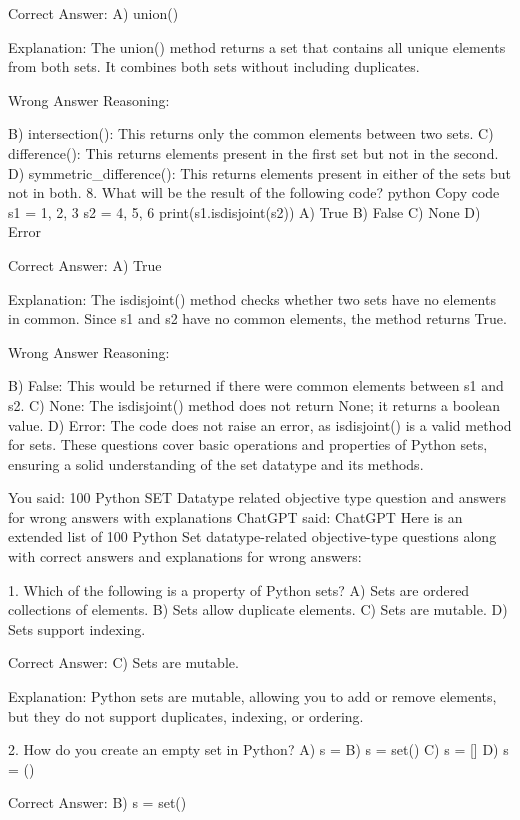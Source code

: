 Correct Answer: A) union()

Explanation:
The union() method returns a set that contains all unique elements from both sets. It combines both sets without including duplicates.

Wrong Answer Reasoning:

B) intersection(): This returns only the common elements between two sets.
C) difference(): This returns elements present in the first set but not in the second.
D) symmetric_difference(): This returns elements present in either of the sets but not in both.
8. What will be the result of the following code?
python
Copy code
s1 = {1, 2, 3}
s2 = {4, 5, 6}
print(s1.isdisjoint(s2))
A) True
B) False
C) None
D) Error

Correct Answer: A) True

Explanation:
The isdisjoint() method checks whether two sets have no elements in common. Since s1 and s2 have no common elements, the method returns True.

Wrong Answer Reasoning:

B) False: This would be returned if there were common elements between s1 and s2.
C) None: The isdisjoint() method does not return None; it returns a boolean value.
D) Error: The code does not raise an error, as isdisjoint() is a valid method for sets.
These questions cover basic operations and properties of Python sets, ensuring a solid understanding of the set datatype and its methods.






You said:
100 Python SET Datatype related objective type question and answers for wrong answers with explanations
ChatGPT said:
ChatGPT
Here is an extended list of 100 Python Set datatype-related objective-type questions along with correct answers and explanations for wrong answers:

1. Which of the following is a property of Python sets?
A) Sets are ordered collections of elements.
B) Sets allow duplicate elements.
C) Sets are mutable.
D) Sets support indexing.

Correct Answer: C) Sets are mutable.

Explanation:
Python sets are mutable, allowing you to add or remove elements, but they do not support duplicates, indexing, or ordering.

2. How do you create an empty set in Python?
A) s = {}
B) s = set()
C) s = []
D) s = ()

Correct Answer: B) s = set()

